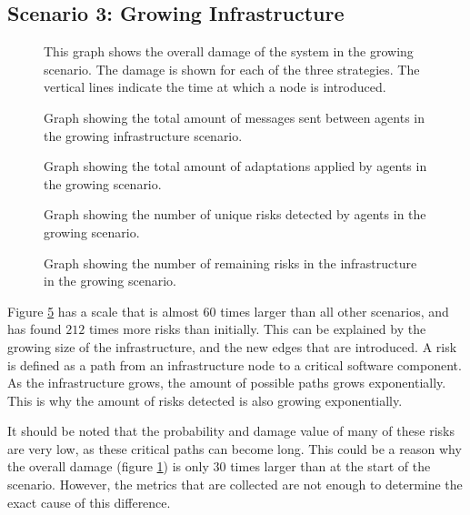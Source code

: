 \subsection{Scenario 3: Growing Infrastructure}
\begin{figure}[H]
    \centering
    
    \caption{This graph shows the overall damage of the system in the growing scenario. The damage is shown for each of the three strategies. The vertical lines indicate the time at which a node is introduced.}
    \label{fig:overall-damage-growing}
\end{figure}


\begin{figure}[H]
    \centering
    
    \caption{Graph showing the total amount of messages sent between agents in the growing infrastructure scenario.}
    \label{fig:messages-growing}
\end{figure}
\begin{figure}[H]
    \centering
    
    \caption{Graph showing the total amount of adaptations applied by agents in the growing scenario.}
    \label{fig:proposals-growing}
\end{figure}
\begin{figure}[H]
    \centering
        
    \caption{Graph showing the number of unique risks detected by agents in the growing scenario.}
    \label{fig:risk-count-growing}
\end{figure}
\begin{figure}[H]
    \centering
        
    \caption{Graph showing the number of remaining risks in the infrastructure in the growing scenario.}
    \label{fig:risk-remaining-growing}
\end{figure}

Figure \ref{fig:risk-remaining-growing} has a scale that is almost $60$ times larger than all other scenarios, and has found $212$ times more risks than initially. This can be explained by the growing size of the infrastructure, and the new edges that are introduced. A risk is defined as a path from an infrastructure node to a critical software component. As the infrastructure grows, the amount of possible paths grows exponentially. This is why the amount of risks detected is also growing exponentially. 

It should be noted that the probability and damage value of many of these risks are very low, as these critical paths can become long. This could be a reason why the overall damage (figure \ref{fig:overall-damage-growing}) is only $30$ times larger than at the start of the scenario. However, the metrics that are collected are not enough to determine the exact cause of this difference.

